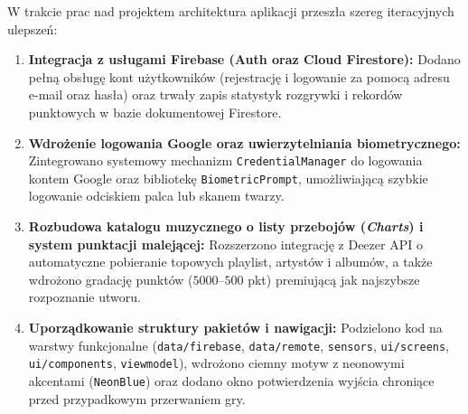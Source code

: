 \hspace{0.60cm}W trakcie prac nad projektem architektura aplikacji przeszła szereg iteracyjnych ulepszeń:
\begin{enumerate}
    \item \textbf{Integracja z usługami Firebase (Auth oraz Cloud Firestore):} Dodano pełną obsługę kont użytkowników (rejestrację i logowanie za pomocą adresu e-mail oraz hasła) oraz trwały zapis statystyk rozgrywki i rekordów punktowych w bazie dokumentowej Firestore.
    \item \textbf{Wdrożenie logowania Google oraz uwierzytelniania biometrycznego:} Zintegrowano systemowy mechanizm \texttt{CredentialManager} do logowania kontem Google oraz bibliotekę \texttt{BiometricPrompt}, umożliwiającą szybkie logowanie odciskiem palca lub skanem twarzy.
    \item \textbf{Rozbudowa katalogu muzycznego o listy przebojów (\textit{Charts}) i system punktacji malejącej:} Rozszerzono integrację z Deezer API o automatyczne pobieranie topowych playlist, artystów i albumów, a także wdrożono gradację punktów ($5000$–$500$ pkt) premiującą jak najszybsze rozpoznanie utworu.
    \item \textbf{Uporządkowanie struktury pakietów i nawigacji:} Podzielono kod na warstwy funkcjonalne (\texttt{data/firebase}, \texttt{data/remote}, \texttt{sensors}, \texttt{ui/screens}, \texttt{ui/components}, \texttt{viewmodel}), wdrożono ciemny motyw z neonowymi akcentami (\texttt{NeonBlue}) oraz dodano okno potwierdzenia wyjścia chroniące przed przypadkowym przerwaniem gry.
\end{enumerate}